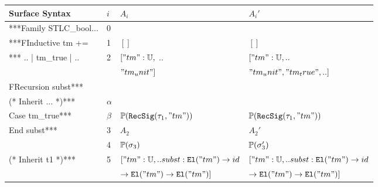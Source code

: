\begin{table}[]
\begin{tabular}{|l|l|l|l|}
\hline
\rowcolor[HTML]{FFFFE6} 
Surface Syntax          & $i$      & $A_i$             & $A_i'$                       \\ \hline
***Family STLC\_bool... & 0        &                   &                              \\ \cline{2-4} 
***FInductive tm +=     & 1        & $[]$              & $[]$                         \\ \cline{2-4} 
*** .. | tm\_true | .. & 2       & $["tm" : \mathbb{U},$ ..                         & $["tm" : \mathbb{U}, ..$                         \\
                        &          & $"tm_unit"]$      & $"tm_unit", "tm_true", .. ]$ \\ \cline{2-4} 
FRecursion subst***     &          &                   &                              \\ \cline{2-4} 
\rowcolor[HTML]{E0D7D7} 
(* Inherit ... *)***    & $\alpha$ &                   &                              \\ \cline{2-4} 
\rowcolor[HTML]{E0D7D7} 
Case tm\_true***       & $\beta$ & $\mathbb{P}({\texttt{RecSig}({\tau_1},{"tm"})})$          & $\mathbb{P}({\texttt{RecSig}({\tau_1},{"tm"})})$          \\ \cline{2-4} 
End subst***            & 3        & $A_2$             & $A_2'$                       \\ \cline{2-4} 
                        & 4        & $\mathbb{P}({\sigma_3})$ & $\mathbb{P}({\sigma_3'})$           \\ \cline{2-4} 
(* Inherit t1 *)***    & 5       & $["tm":\mathbb{U}, .. subst : \texttt{El}({"tm"}) \to id $ & $["tm":\mathbb{U}, .. subst : \texttt{El}({"tm"}) \to id $ \\
                       &         & $ \to \texttt{El}({"tm"}) \to \texttt{El}({"tm"}) ]$          & $ \to \texttt{El}({"tm"}) \to \texttt{El}({"tm"}) ]$          \\ \hline
\end{tabular}
\end{table}

